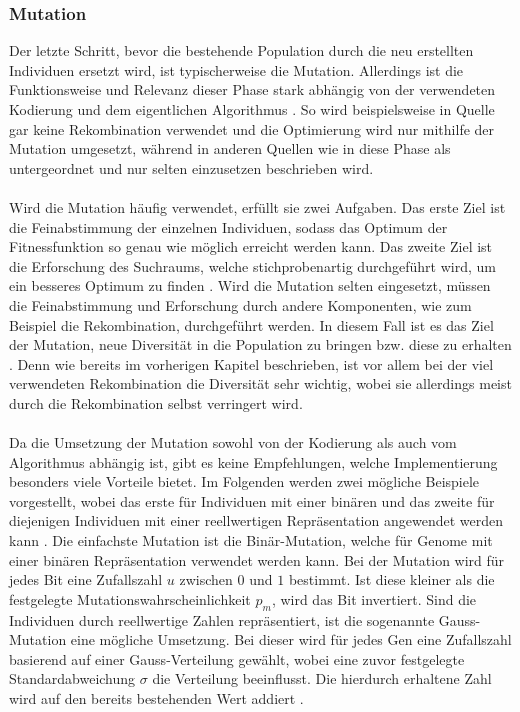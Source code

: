 \subsubsection{Mutation}
\label{subsubsec:ea_mutation}
Der letzte Schritt, bevor die bestehende Population durch die neu erstellten Individuen ersetzt wird, ist typischerweise die Mutation. Allerdings ist die Funktionsweise und Relevanz dieser Phase stark abhängig von der verwendeten Kodierung und dem eigentlichen Algorithmus \cite{weicker2015evolutionare}. So wird beispielsweise in Quelle \cite{such2017deep} gar keine Rekombination verwendet und die Optimierung wird nur mithilfe der Mutation umgesetzt, während in anderen Quellen wie in \cite{zoller2007kunstliche} diese Phase als untergeordnet und nur selten einzusetzen beschrieben wird.
\\\\
Wird die Mutation häufig verwendet, erfüllt sie zwei Aufgaben. Das erste Ziel ist die Feinabstimmung der einzelnen Individuen, sodass das Optimum der Fitnessfunktion so genau wie möglich erreicht werden kann. Das zweite Ziel ist die Erforschung des Suchraums, welche stichprobenartig durchgeführt wird, um ein besseres Optimum zu finden \cite{weicker2015evolutionare}.  Wird die Mutation selten eingesetzt, müssen die Feinabstimmung und Erforschung durch andere Komponenten, wie zum Beispiel die Rekombination, durchgeführt werden. In diesem Fall ist es das Ziel der Mutation, neue Diversität in die Population zu bringen bzw. diese zu erhalten \cite{weicker2015evolutionare}. Denn wie bereits im vorherigen Kapitel beschrieben, ist vor allem bei der viel verwendeten Rekombination die Diversität sehr wichtig, wobei sie allerdings meist durch die Rekombination selbst verringert wird.
\\\\
Da die Umsetzung der Mutation sowohl von der Kodierung als auch vom Algorithmus abhängig ist, gibt es keine Empfehlungen, welche Implementierung besonders viele Vorteile bietet. Im Folgenden werden zwei mögliche Beispiele vorgestellt, wobei das erste für Individuen mit einer binären und das zweite für diejenigen Individuen mit einer reellwertigen Repräsentation angewendet werden kann \cite{weicker2015evolutionare}. Die einfachste Mutation ist die Binär-Mutation, welche für Genome mit einer binären Repräsentation verwendet werden kann. Bei der Mutation wird für jedes Bit eine Zufallszahl $u$ zwischen $0$ und $1$ bestimmt. Ist diese kleiner als die festgelegte Mutationswahrscheinlichkeit $p_m$, wird das Bit invertiert. Sind die Individuen durch reellwertige Zahlen repräsentiert, ist die sogenannte Gauss-Mutation eine mögliche Umsetzung. Bei dieser wird für jedes Gen eine Zufallszahl basierend auf einer Gauss-Verteilung gewählt, wobei eine zuvor festgelegte Standardabweichung $\sigma$ die Verteilung beeinflusst. Die hierdurch erhaltene Zahl wird auf den bereits bestehenden Wert addiert \cite{weicker2015evolutionare}.

